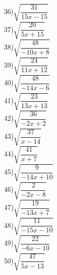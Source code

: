 \documentclass[12pt,a4paper]{article}
\begin{document}
36)$\sqrt{\dfrac{31}{15x-15}}$\\
37)$\sqrt{\dfrac{20}{5x+15}}$\\
38)$\sqrt{\dfrac{48}{-10x+8}}$\\
39)$\sqrt{\dfrac{24}{11x+12}}$\\
40)$\sqrt{\dfrac{48}{-14x-6}}$\\
41)$\sqrt{\dfrac{23}{13x+13}}$\\
42)$\sqrt{\dfrac{36}{-2x+2}}$\\
43)$\sqrt{\dfrac{37}{x-14}}$\\
44)$\sqrt{\dfrac{41}{x+7}}$\\
45)$\sqrt{\dfrac{9}{-14x+10}}$\\
46)$\sqrt{\dfrac{2}{-2x-8}}$\\
47)$\sqrt{\dfrac{19}{-13x+7}}$\\
48)$\sqrt{\dfrac{11}{-15x-10}}$\\
49)$\sqrt{\dfrac{22}{-6x-10}}$\\
50)$\sqrt{\dfrac{47}{5x-13}}$\\
\end{document}
